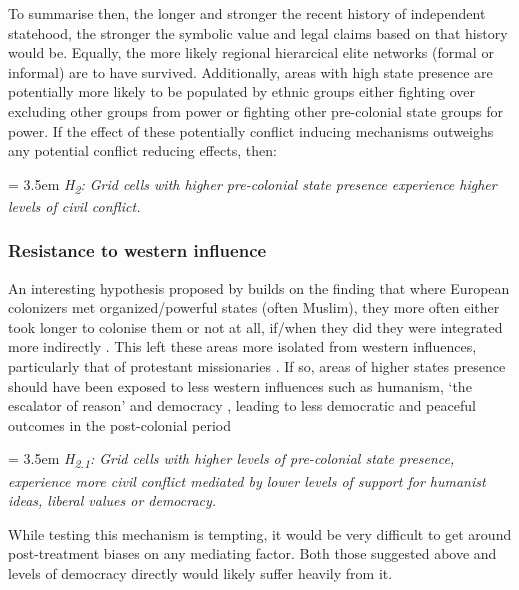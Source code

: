\documentclass[12pt]{article}
\begin{document}
\begin{multicols}{2}
To summarise then, the longer and stronger the recent history of independent
statehood, the stronger the symbolic value and legal claims based on that
history would be. Equally, the more likely regional hierarcical elite networks
(formal or informal) are to have survived. Additionally, areas with high state
presence are potentially more likely to be populated by ethnic groups either
fighting over excluding other groups from power or fighting other pre-colonial
state groups for power. If the effect of these potentially conflict inducing
mechanisms outweighs any potential conflict reducing effects, then:

\bigskip

\hangindent = 3.5em \textit{H\textsubscript{2}: Grid cells with higher
pre-colonial state presence experience higher levels of civil conflict.}

\bigskip 

\subsubsection{Resistance to western influence}

An interesting hypothesis proposed by \citet{Wishman} builds on the finding that
where European colonizers met organized/powerful states (often Muslim), they
more often either took longer to colonise them or not at all, if/when they did
they were integrated more indirectly \citep{Gerring2011, Hariri2012,
Englebert2000}. This left these areas more isolated from western influences,
particularly that of protestant missionaries \citep{Woodberry2012}. If so, areas
of higher states presence should have been exposed to less western influences
such as humanism, `the escalator of reason' \citep{Pinker2012} and democracy
\citep{Woodberry2012, Hariri2012}, leading to less democratic and peaceful
outcomes in the post-colonial period \citep{Hegre2006}

\bigskip

\hangindent = 3.5em \textit{H\textsubscript{2.1}: Grid cells with higher levels
of pre-colonial state presence, experience more civil conflict mediated by lower
levels of support for humanist ideas, liberal values or democracy.}

\bigskip

While testing this mechanism is tempting, it would be very difficult to get
around post-treatment biases on any mediating factor. Both those suggested above
and levels of democracy directly would likely suffer heavily from it.


\end{multicols}
\end{document}
